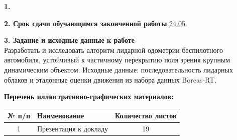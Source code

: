 \documentclass[master, fontsize=12pt]{diploma}
\begin{document}
\fillTaskHeader

\textbf{1.} \makeThemeLine

\textbf{2. Срок сдачи обучающимся законченной работы} \uline{24.05.\the\year \hfill}

\textbf{3. Задание и исходные данные к работе}\\
Разработать и исследовать алгоритм лидарной одометрии беспилотного автомобиля, устойчивый к частичному перекрытию поля зрения крупным динамическим объектом.
Исходные данные: последовательность лидарных облаков и эталонные оценки движения из набора данных Boreas-RT.

\textbf{Перечень иллюстративно-графических материалов:}
\vspace{\parskip}
\begin{table}
    \begin{tabularx}{\textwidth}{|c|X|c|}\hline
    \textbf{№ п/п} & \centering\textbf{Наименование} & \textbf{Количество листов} \\ \hline
    1 & Презентация к докладу & 19 \\ \hline
    \end{tabularx}
\end{table}

\vfill\clearpage
{} %
\end{document}
